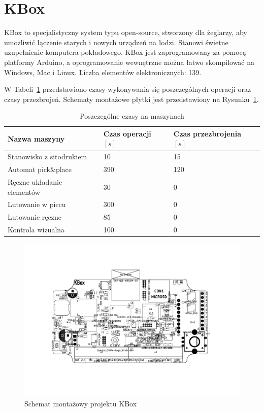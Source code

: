 \section{KBox}
KBox to specjalistyczny system typu open-source, stworzony dla żeglarzy, aby umożliwić łączenie starych i nowych urządzeń na łodzi. Stanowi świetne uzupełnienie komputera pokładowego. KBox jest zaprogramowany za pomocą platformy Arduino, a oprogramowanie wewnętrzne można łatwo skompilować na Windows, Mac i Linux.
Liczba elementów elektronicznych: 139.

\breakparagraph{}
W Tabeli~\ref{kbox:tab} przedstawiono czasy wykonywania się poszczególnych operacji oraz czasy przezbrojeń. Schematy montażowe płytki jest przedstawiony na Rysunku~\ref{kbox:sche}.

\begin{table}[H]
	\centering
	\caption{Poszczególne czasy na maszynach}
	\begin{tabular}{lll}
		\toprule
		Nazwa maszyny                 & Czas operacji $[s]$ & Czas przezbrojenia $[s]$ \\
		\midrule
		Stanowisko z sitodrukiem      & 10                  & 15                       \\
		Automat pick\&place           & 390                 & 120                      \\
		Ręczne układanie elementów & 30                  & 0                        \\
		Lutowanie w piecu             & 300                 & 0                        \\
		Lutowanie ręczne             & 85                  & 0                        \\
		Kontrola wizualna             & 100                 & 0                        \\
		\bottomrule
	\end{tabular}
	\label{kbox:tab}
\end{table}

\begin{figure}[H]
	\centering
	\includegraphics[scale=0.7,clip, trim=3.8cm 4cm 3.8cm 3cm]{chapters/chapter5/kbox-rotated.pdf}
	\caption{Schemat montażowy projektu KBox}
	\label{kbox:sche}
\end{figure}

